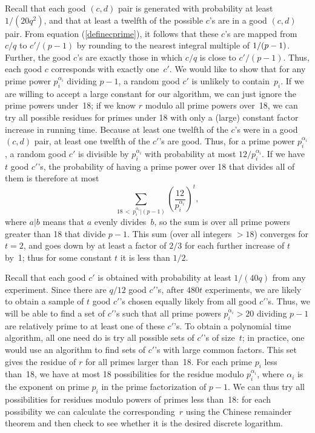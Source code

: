 Recall that each good $(c,d)$ pair is generated with probability
at least $1/(20q^2)$, and that at least a twelfth of the possible $c$'s 
are in a good $(c,d)$ pair.  From equation (\ref{definecprime}), it follows
that these $c$'s are mapped from $c/q$ to
$c'/(p-1)$ by rounding to the nearest integral multiple of \linebreak[3]
$1/\linebreak[1](p-1)$.
Further, the good $c$'s are exactly those in which ${c}/{q}$ is
close to ${c'}/(p-1)$.  Thus, each good $c$ corresponds with exactly
one~$c'$.  We would like to show that for any prime power 
$p_i^{\alpha_i}$ dividing $p-1$, a random good $c'$ is unlikely to 
contain~$p_i$.  If we are willing to accept a large constant for 
our algorithm, we can just ignore the prime powers under~18; if we know 
$r$ modulo all prime powers
over~18, we can try all possible residues for primes under 18 with only a 
(large) constant factor increase in running time.   
Because at least one twelfth of the $c$'s were in a good
$(c,d)$ pair, at least one twelfth of the $c'$'s are good.  Thus,
for a prime power $p_i^{\alpha_i}$, a random good $c'$ is
divisible by $p_i^{\alpha_i}$ with probability at most $12/p_i^{\alpha_i}$.  
If we have $t$ good $c'$'s, the probability 
of having a prime power over 18 that divides all of them is therefore at most
\begin{equation}
\sum_{18 \,<\, p_i^{\alpha_i} \big| (p-1)} 
\left(\frac{12}{p_i^{\alpha_i}}\right)^t,
\end{equation}
where $a|b$ means that $a$ evenly divides~$b$, so
the sum is over all prime powers greater than 18 that divide $p-1$.
This sum (over all integers $> 18$) converges for $t=2$, and goes down
by at least a factor of $2/3$ for each further increase of $t$ by~1; thus for
some constant $t$ it is less than $1/2$.  

Recall that each good $c'$ 
is obtained with probability at least $1/(40q)$ from any experiment.  Since 
there are $q/12$ good $c'$'s, after $480t$ experiments, we are likely 
to obtain a sample of $t$ good $c'$'s chosen equally likely from all
good $c'$'s.  Thus, we will be able to find a set of $c'$'s such
that all prime powers $p_i^{\alpha_i} > 20$ dividing $p-1$ are relatively 
prime to at least one of these $c'$'s.  
To obtain a polynomial time algorithm,
all one need do is try all possible sets of $c'$'s of size~$t$; in practice,
one would use an algorithm to find sets of $c'$'s with large common factors.
This set gives the residue of $r$ for all primes larger than~18.  
For each prime $p_i$ less than~18, we have at most 18 possibilities
for the residue modulo $p_i^{\alpha_i}$, where $\alpha_i$ is the exponent
on prime $p_i$ in the prime factorization of $p-1$.  We can thus try all
possibilities for residues modulo powers of primes less than~18:  for each
possibility we can calculate the corresponding~$r$ using the Chinese 
remainder theorem and then check to see whether it is the desired discrete
logarithm.  


